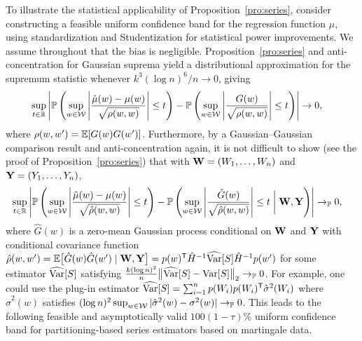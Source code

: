 To illustrate the statistical applicability of
Proposition~\ref{pro:series}, consider constructing a feasible uniform
confidence band for the regression function $\mu$, using standardization and
Studentization for statistical power improvements. We assume throughout that
the bias is negligible. Proposition~\ref{pro:series} and anti-concentration for
Gaussian suprema \citep[Corollary~2.1]{chernozhukov2014anti} yield
a distributional approximation for the supremum statistic whenever
$k^3(\log n)^6 / n \to 0$, giving
%
\begin{align*}
  \sup_{t \in \mathbb{R}}
  \left|
  \mathbb{P}\left(
    \sup_{w \in \mathcal{W}}
    \left|
    \frac{\hat\mu(w)-\mu(w)}{\sqrt{\rho(w,w)}}
    \right| \leq t
  \right)
  -
  \mathbb{P}\left(
    \sup_{w \in \mathcal{W}}
    \left|
    \frac{G(w)}{\sqrt{\rho(w,w)}}
    \right| \leq t
  \right)
  \right|
  &\to 0,
\end{align*}
%
where $\rho(w,w') = \mathbb{E}[G(w)G(w')]$. Furthermore, by a Gaussian--Gaussian
comparison result \citep[Lemma~3.1]{chernozhukov2013gaussian} and
anti-concentration again, it is not difficult to show (see the proof of
Proposition~\ref{pro:series}) that with $\mathbf{W} = (W_1, \ldots, W_n)$ and
$\mathbf{Y} = (Y_1, \ldots, Y_n)$,
%
\begin{align*}
  \sup_{t \in \mathbb{R}}
  \left|
  \mathbb{P}\left(
    \sup_{w \in \mathcal{W}}
    \left|
    \frac{\hat\mu(w)-\mu(w)}{\sqrt{\hat\rho(w,w)}}
    \right| \leq t
  \right)
  - \mathbb{P}\left(
    \sup_{w \in \mathcal{W}}
    \left|
    \frac{\hat G(w)}{\sqrt{\hat\rho(w,w)}}
    \right| \leq t \biggm| \mathbf{W}, \mathbf{Y}
  \right)
  \right|
  &\to_{\mathbb{P}} 0,
\end{align*}
%
where $\hat G(w)$ is a zero-mean Gaussian process
conditional on $\mathbf{W}$ and $\mathbf{Y}$ with conditional covariance function
$\hat\rho(w,w')
=\mathbb{E}\big[\hat G(w) \hat G(w') \mid \mathbf{W}, \mathbf{Y} \big]
= p(w)^{\mathsf{T}} \hat H^{-1} \widehat{\operatorname{Var}}[S] \hat H^{-1}p(w')$
for some estimator $\widehat{\operatorname{Var}}[S]$ satisfying
$\frac{k (\log n)^2}{n}
\big\|\widehat{\operatorname{Var}}[S]-\operatorname{Var}[S]\big\|_2 \to_{\mathbb{P}} 0$.
For example, one could use the plug-in estimator
$\widehat{\operatorname{Var}}[S]=\sum_{i=1}^n p(W_i) p(W_i)^{\mathsf{T}} \hat{\sigma}^2(W_i)$
where $\hat{\sigma}^2(w)$ satisfies
$(\log n)^2 \sup_{w \in \mathcal{W}}
|\hat{\sigma}^2(w)-\sigma^2(w)| \to_{\mathbb{P}} 0$.
This leads to the following feasible and asymptotically valid
$100(1-\tau)\%$
uniform confidence band for partitioning-based series estimators
based on martingale data.

